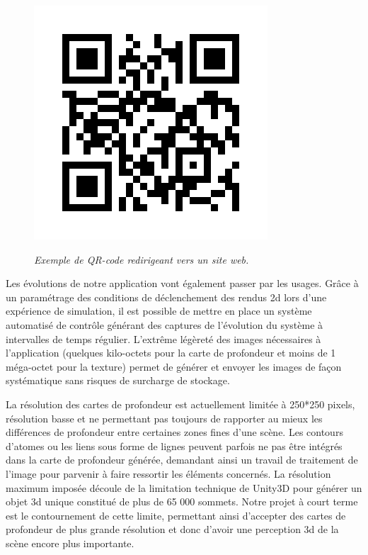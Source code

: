 \begin{figure}[h]
  \centering
  {\includegraphics[width=.75\linewidth]{./figures/conclusion/qr_code.jpg}}
    \caption{{\it Exemple de QR-code redirigeant vers un site web.}}
  \label{Fig:qr_code}
  \hspace{0.2cm}
\end{figure}

Les évolutions de notre application vont également passer par les usages. Grâce à un paramétrage des conditions de déclenchement des rendus 2d lors d'une expérience de simulation, il est possible de mettre en place un système automatisé de contrôle générant des captures de l'évolution du système à intervalles de temps régulier. L'extrême légèreté des images nécessaires à l'application (quelques kilo-octets pour la carte de profondeur et moins de 1 méga-octet pour la texture) permet de générer et envoyer les images de façon systématique sans risques de surcharge de stockage.

La résolution des cartes de profondeur est actuellement limitée à 250*250 pixels, résolution basse et ne permettant pas toujours de rapporter au mieux les différences de profondeur entre certaines zones fines d'une scène. Les contours d'atomes ou les liens sous forme de lignes peuvent parfois ne pas être intégrés dans la carte de profondeur générée, demandant ainsi un travail de traitement de l'image pour parvenir à faire ressortir les éléments concernés. La résolution maximum imposée découle de la limitation technique de Unity3D pour générer un objet 3d unique constitué de plus de 65 000 sommets. Notre projet à court terme est le contournement de cette limite, permettant ainsi d'accepter des cartes de profondeur de plus grande résolution et donc d'avoir une perception 3d de la scène encore plus importante.

